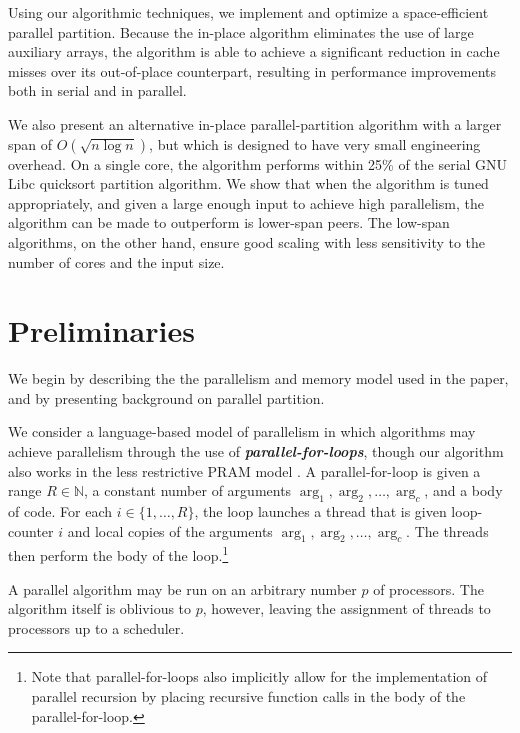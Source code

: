 \documentclass[sigconf]{acmart}
\newcommand{\defn}[1]       {{\textit{\textbf{\boldmath #1}}}}
\renewcommand{\paragraph}[1]{\vspace{0.09in}\noindent{\bf \boldmath #1.}}
\theoremstyle{remark}
\theoremstyle{remark}
\begin{document}
Using our algorithmic techniques, we implement and optimize a
space-efficient parallel partition. Because the in-place algorithm
eliminates the use of large auxiliary arrays, the algorithm is able to
achieve a significant reduction in cache misses over its out-of-place
counterpart, resulting in performance improvements both in serial and
in parallel.

We also present an alternative in-place parallel-partition algorithm
with a larger span of $O(\sqrt{n \log n})$, but which is designed to
have very small engineering overhead. On a single core, the algorithm
performs within 25\% of the serial GNU Libc quicksort partition
algorithm. We show that when the algorithm is tuned appropriately, and
given a large enough input to achieve high parallelism, the algorithm
can be made to outperform is lower-span peers. The low-span
algorithms, on the other hand, ensure good scaling with less
sensitivity to the number of cores and the input size.


\section{Preliminaries}\label{secprelim}

We begin by describing the the parallelism and memory model used in
the paper, and by presenting background on parallel partition.

\paragraph{Workflow Model} We consider a language-based model of parallelism in which algorithms may achieve parallelism
through the use of \defn{parallel-for-loops}, though our algorithm
also works in the less restrictive PRAM model
\cite{Blelloch96,AcarBl16}.  A parallel-for-loop is given a range $R
\in \mathbb{N}$, a constant number of arguments $\arg_1, \arg_2,
\ldots, \arg_c$, and a body of code. For each $i \in \{1, \ldots,
R\}$, the loop launches a thread that is given loop-counter $i$ and
local copies of the arguments $\arg_1, \arg_2, \ldots, \arg_c$. The
threads then perform the body of the loop.\footnote{Note that
  parallel-for-loops also implicitly allow for the implementation of
  parallel recursion by placing recursive function calls in the body
  of the parallel-for-loop.}

A parallel algorithm may be run on an arbitrary number $p$ of
processors. The algorithm itself is oblivious to $p$, however, leaving
the assignment of threads to processors up to a scheduler.
\end{document}
